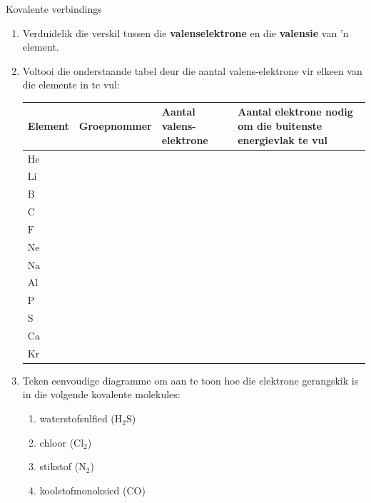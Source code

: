 \begin{exercises}{Kovalente verbindings}
{
            \nopagebreak
        \label{m38704*id139588}\begin{enumerate}[noitemsep, label=\textbf{\arabic*}. ] 
            \label{m38704*uid10}\item Verduidelik die verskil tussen die \textbf{valenselektrone} en die \textbf{valensie} van  'n  element.
\label{m38704*uid11}\item Voltooi die onderstaande tabel deur die aantal valens-elektrone vir elkeen van die elemente in te vul:
          \begin{table}[H]
        \begin{center}
      \label{m38704*id139625}
    \noindent
      \begin{tabular}{|l|l|p{3cm}|p{3cm}|}\hline
\textbf{Element} & \textbf{Groepnommer} & \textbf{Aantal valens-elektrone} & \textbf{Aantal elektrone nodig om die buitenste energievlak te vul}  \\ \hline
        $\text{He}$ & & & \\ \hline
        $\text{Li}$ & & & \\ \hline
        $\text{B}$ & & & \\ \hline
        $\text{C}$ & & & \\ \hline
        $\text{F}$ & & & \\ \hline
        $\text{Ne}$ & & & \\ \hline
        $\text{Na}$ & & & \\ \hline
        $\text{Al}$ & & & \\ \hline
        $\text{P}$ & & & \\ \hline
        $\text{S}$ & & & \\ \hline
        $\text{Ca}$ & & & \\ \hline
        $\text{Kr}$ & & & \\ \hline
    \end{tabular}
      \end{center}
\end{table}
          \label{m38704*uid12}\item Teken eenvoudige diagramme om aan te toon hoe die elektrone gerangskik is in die volgende kovalente molekules:
\label{m38704*id140030}\begin{enumerate}[noitemsep, label=\textbf{\alph*}. ] 
            \label{m38704*uid13}\item waterstofsulfied ($\text{H}_{2}\text{S}$)
\label{m38704*uid14}\item chloor ($\text{Cl}_{2}$)
\item stikstof ($\text{N}_2$)
\item koolstofmonoksied ($\text{CO}$)
\end{enumerate}
                \end{enumerate}

}
\end{exercises}
